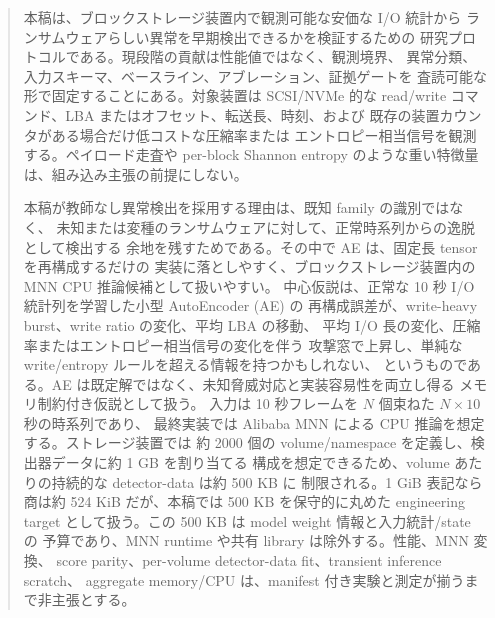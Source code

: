 \begin{abstract}
本稿は、ブロックストレージ装置内で観測可能な安価な I/O 統計から
ランサムウェアらしい異常を早期検出できるかを検証するための
研究プロトコルである。現段階の貢献は性能値ではなく、観測境界、
異常分類、入力スキーマ、ベースライン、アブレーション、証拠ゲートを
査読可能な形で固定することにある。対象装置は SCSI/NVMe 的な
read/write コマンド、LBA またはオフセット、転送長、時刻、および
既存の装置カウンタがある場合だけ低コストな圧縮率または
エントロピー相当信号を観測する。ペイロード走査や per-block Shannon
entropy のような重い特徴量は、組み込み主張の前提にしない。

本稿が教師なし異常検出を採用する理由は、既知 family の識別ではなく、
未知または変種のランサムウェアに対して、正常時系列からの逸脱として検出する
余地を残すためである。その中で AE は、固定長 tensor を再構成するだけの
実装に落としやすく、ブロックストレージ装置内の MNN CPU 推論候補として扱いやすい。
中心仮説は、正常な 10 秒 I/O 統計列を学習した小型 AutoEncoder (AE) の
再構成誤差が、write-heavy burst、write ratio の変化、平均 LBA の移動、
平均 I/O 長の変化、圧縮率またはエントロピー相当信号の変化を伴う
攻撃窓で上昇し、単純な write/entropy ルールを超える情報を持つかもしれない、
というものである。AE は既定解ではなく、未知脅威対応と実装容易性を両立し得る
メモリ制約付き仮説として扱う。
入力は 10 秒フレームを $N$ 個束ねた $N \times 10$ 秒の時系列であり、
最終実装では Alibaba MNN による CPU 推論を想定する。ストレージ装置では
約 2000 個の volume/namespace を定義し、検出器データに約 1 GB を割り当てる
構成を想定できるため、volume あたりの持続的な detector-data は約 500 KB に
制限される。1 GiB 表記なら商は約 524 KiB だが、本稿では 500 KB を保守的に丸めた
engineering target として扱う。この 500 KB は model weight 情報と入力統計/state の
予算であり、MNN runtime や共有 library は除外する。性能、MNN 変換、
score parity、per-volume detector-data fit、transient inference scratch、
aggregate memory/CPU は、manifest 付き実験と測定が揃うまで非主張とする。
\end{abstract}
